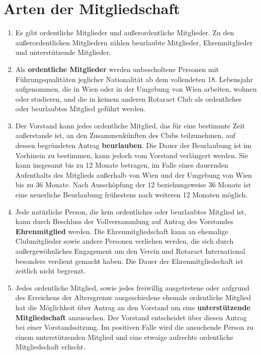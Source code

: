 \documentclass{article}
\begin{document}
\section{Arten der Mitgliedschaft}
\begin{enumerate}
    \item Es gibt ordentliche Mitglieder und außerordentliche Mitglieder. Zu den außerordentlichen Mitgliedern zählen beurlaubte Mitglieder, Ehrenmitglieder und unterstützende Mitglieder.
    \item Als \textbf{ordentliche Mitglieder} werden unbescholtene Personen mit Führungsqualitäten jeglicher Nationalität ab dem vollendeten 18. Lebensjahr aufgenommen, die in Wien oder in der Umgebung von Wien arbeiten, wohnen oder studieren, und die in keinem anderen Rotaract Club als ordentliches oder beurlaubtes Mitglied geführt werden.
    \item Der Vorstand kann jedes ordentliche Mitglied, das für eine bestimmte Zeit außerstande ist, an den Zusammenkünften des Clubs teilzunehmen, auf dessen begründeten Antrag \textbf{beurlauben}. Die Dauer der Beurlaubung ist im Vorhinein zu bestimmen, kann jedoch vom Vorstand verlängert werden. Sie kann insgesamt bis zu 12 Monate betragen, im Falle eines dauernden Aufenthalts des Mitglieds außerhalb von Wien und der Umgebung von Wien bis zu 36 Monate. Nach Ausschöpfung der 12 beziehungsweise 36 Monate ist eine neuerliche Beurlaubung frühestens nach weiteren 12 Monaten möglich.
    \item Jede natürliche Person, die kein ordentliches oder beurlaubtes Mitglied ist, kann durch Beschluss der Vollversammlung auf Antrag des Vorstandes \textbf{Ehrenmitglied} werden. Die Ehrenmitgliedschaft kann an ehemalige Clubmitglieder sowie andere Personen verliehen werden, die sich durch außergewöhnliches Engagement um den Verein und Rotaract International besonders verdient gemacht haben. Die Dauer der Ehrenmitgliedschaft ist zeitlich nicht begrenzt.
    \item Jedes ordentliche Mitglied, sowie jedes freiwillig ausgetretene oder aufgrund des Erreichens der Altersgrenze ausgeschiedene ehemals ordentliche Mitglied hat die Möglichkeit über Antrag an den Vorstand um eine \textbf{unterstützende Mitgliedschaft} anzusuchen. Der Vorstand entscheidet über diesen Antrag bei einer Vorstandssitzung. Im positiven Falle wird die ansuchende Person zu einem unterstützenden Mitglied und eine etwaige aufrechte ordentliche Mitgliedschaft erlischt.
\end{enumerate}
\end{document}
